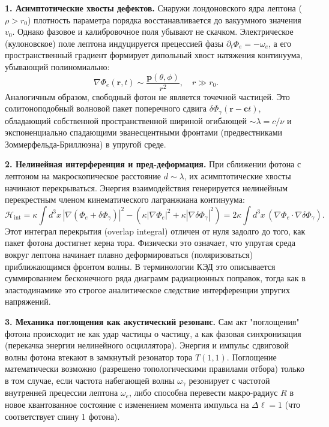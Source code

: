 \documentclass[11pt,a4paper]{article}
\begin{document}
	\textbf{1. Асимптотические хвосты дефектов.}
	Снаружи лондоновского ядра лептона ($\rho > r_0$) плотность параметра порядка восстанавливается до вакуумного значения $v_0$. Однако фазовое и калибровочное поля убывают не скачком. Электрическое (кулоновское) поле лептона индуцируется прецессией фазы $\partial_t \Phi_e = -\omega_e$, а его пространственный градиент формирует дипольный хвост натяжения континуума, убывающий полиномиально:
	\begin{equation}
		\nabla \Phi_e(\mathbf{r}, t) \sim \frac{\mathbf{p}(\theta, \phi)}{r^2}, \quad r \gg r_0.
	\end{equation}
	Аналогичным образом, свободный фотон не является точечной частицей. Это солитоноподобный волновой пакет поперечного сдвига $\delta \Phi_\gamma(\mathbf{r}-\mathbf{c}t)$, обладающий собственной пространственной шириной огибающей $\sim \lambda = c/\nu$ и экспоненциально спадающими эванесцентными фронтами (предвестниками Зоммерфельда-Бриллюэна) в упругой среде.
	
	\textbf{2. Нелинейная интерференция и пред-деформация.}
	При сближении фотона с лептоном на макроскопическое расстояние $d \sim \lambda$, их асимптотические хвосты начинают перекрываться. Энергия взаимодействия генерируется нелинейным перекрестным членом кинематического лагранжиана континуума:
	\begin{equation}
		\mathcal{H}_{\text{int}} = \kappa \int d^3x \, \left| \nabla (\Phi_e + \delta \Phi_\gamma) \right|^2 - \left( \kappa |\nabla \Phi_e|^2 + \kappa |\nabla \delta \Phi_\gamma|^2 \right) = 2\kappa \int d^3x \, (\nabla \Phi_e \cdot \nabla \delta \Phi_\gamma).
	\end{equation}
	Этот интеграл перекрытия (overlap integral) отличен от нуля задолго до того, как пакет фотона достигнет керна тора. Физически это означает, что упругая среда вокруг лептона начинает плавно деформироваться (поляризоваться) приближающимся фронтом волны. В терминологии КЭД это описывается суммированием бесконечного ряда диаграмм радиационных поправок, тогда как в эластодинамике это строгое аналитическое следствие интерференции упругих напряжений.
	
	\textbf{3. Механика поглощения как акустический резонанс.}
	Сам акт "поглощения" фотона происходит не как удар частицы о частицу, а как фазовая синхронизация (перекачка энергии нелинейного осциллятора). Энергия и импульс сдвиговой волны фотона втекают в замкнутый резонатор тора $T(1,1)$. 
	Поглощение математически возможно (разрешено топологическими правилами отбора) только в том случае, если частота набегающей волны $\omega_\gamma$ резонирует с частотой внутренней прецессии лептона $\omega_e$, либо способна перевести макро-радиус $R$ в новое квантованное состояние с изменением момента импульса на $\Delta \ell = 1$ (что соответствует спину 1 фотона). 
	
\end{document}
